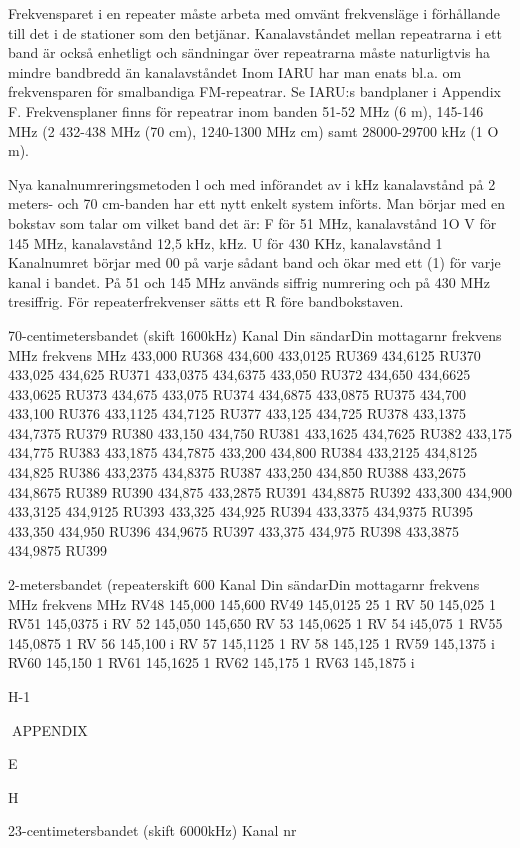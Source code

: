 \documentclass[a4paper,twoside,twocolumn,openright]{book}
\begin{document}
{{{{{{{{{{{Frekvensparet i en repeater måste arbeta med omvänt frekvensläge i förhållande
till det i de stationer som den betjänar.
Kanalavståndet mellan repeatrarna i ett
band är också enhetligt och sändningar över
repeatrarna måste naturligtvis ha mindre
bandbredd än kanalavståndet
Inom IARU har man enats bl.a. om frekvensparen för smalbandiga FM-repeatrar.
Se IARU:s bandplaner i Appendix F.
Frekvensplaner finns för repeatrar inom
banden 51-52 MHz (6 m), 145-146 MHz (2
432-438 MHz (70 cm), 1240-1300 MHz
cm) samt 28000-29700 kHz (1 O m).

Nya kanalnumreringsmetoden
l och med införandet av i
kHz kanalavstånd på 2 meters- och 70 cm-banden har
ett nytt enkelt system införts. Man börjar med
en bokstav som talar om vilket band det är:
F för 51 MHz, kanalavstånd 1O
V för 145 MHz, kanalavstånd 12,5 kHz,
kHz.
U för 430 KHz, kanalavstånd 1
Kanalnumret börjar med 00 på varje sådant band och ökar med ett (1) för varje kanal
i bandet. På 51 och 145 MHz används
siffrig numrering och på 430 MHz tresiffrig.
För repeaterfrekvenser sätts ett R före bandbokstaven.

70-centimetersbandet (skift 1600kHz)
Kanal
Din sändarDin mottagarnr
frekvens MHz frekvens MHz
433,000
RU368
434,600
433,0125
RU369
434,6125
RU370
433,025
434,625
RU371
433,0375
434,6375
433,050
RU372
434,650
434,6625
433,0625
RU373
434,675
433,075
RU374
434,6875
433,0875
RU375
434,700
433,100
RU376
433,1125
434,7125
RU377
433,125
434,725
RU378
433,1375
434,7375
RU379
RU380
433,150
434,750
RU381
433,1625
434,7625
RU382
433,175
434,775
RU383
433,1875
434,7875
433,200
434,800
RU384
433,2125
434,8125
434,825
RU386
433,2375
434,8375
RU387
433,250
434,850
RU388
433,2675
434,8675
RU389
RU390
434,875
433,2875
RU391
434,8875
RU392
433,300
434,900
433,3125
434,9125
RU393
433,325
434,925
RU394
433,3375
434,9375
RU395
433,350
434,950
RU396
434,9675
RU397
433,375
434,975
RU398
433,3875
434,9875
RU399

2-metersbandet (repeaterskift 600
Kanal
Din sändarDin mottagarnr
frekvens MHz
frekvens MHz
RV48
145,000
145,600
RV49
145,0125
25
1
RV 50
145,025
1
RV51
145,0375
i
RV 52
145,050
145,650
RV 53
145,0625
1
RV 54
i45,075
1
RV55
145,0875
1
RV 56
145,100
i
RV 57
145,1125
1
RV 58
145,125
1
RV59
145,1375
i
RV60
145,150
1
RV61
145,1625
1
RV62
145,175
1
RV63
145,1875
i

H-1

APPENDIX

E

H

23-centimetersbandet (skift 6000kHz)
Kanal
nr

}}}}}}}}}}}
\end{document}
